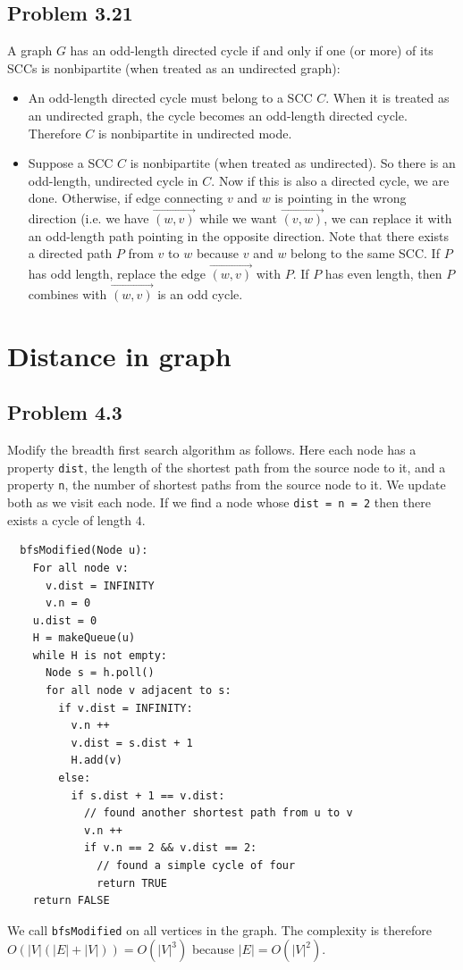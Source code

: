 \documentclass[12pt]{report}
\newcommand{\co}{\texttt}
\begin{document}
\section{Problem 3.21}
A graph $G$ has an odd-length directed cycle if and only if one (or more) of its SCCs is nonbipartite (when treated as an undirected graph):
\begin{itemize}
	\item An odd-length directed cycle must belong to a SCC $C$. When it is treated as an undirected graph, the cycle becomes an odd-length directed cycle. Therefore $C$ is nonbipartite in undirected mode.
	\item Suppose a SCC $C$ is nonbipartite (when treated as undirected). So there is an odd-length, undirected cycle in $C$. Now if this is also a directed cycle, we are done. Otherwise, if edge connecting $v$ and $w$ is pointing in the wrong direction (i.e. we have $\overrightarrow{(w,v)}$ while we want $\overrightarrow{(v,w)}$, we can replace it with an odd-length path pointing in the opposite direction. Note that there exists a directed path $P$ from $v$ to $w$ because $v$ and $w$ belong to the same SCC. If $P$ has odd length, replace the edge $\overrightarrow{(w,v)}$ with $P$. If $P$ has even length, then $P$ combines with $\overrightarrow{(w,v)}$ is an odd cycle.
\end{itemize}

\chapter[Chapter 4 Solution]{Distance in graph}
\section{Problem 4.3}
Modify the breadth first search algorithm as follows. Here each node has a property \co{dist}, the length of the shortest path from the source node to it, and a property \co{n}, the number of shortest paths from the source node to it. We update both as we visit each node. If we find a node whose \co{dist = n = 2} then there exists a cycle of length $4$.
\begin{lstlisting}
  bfsModified(Node u):
    For all node v:
      v.dist = INFINITY
      v.n = 0
    u.dist = 0
    H = makeQueue(u)
    while H is not empty:
      Node s = h.poll()
      for all node v adjacent to s:
        if v.dist = INFINITY:
          v.n ++
          v.dist = s.dist + 1
          H.add(v)
        else:
          if s.dist + 1 == v.dist:
            // found another shortest path from u to v
            v.n ++
            if v.n == 2 && v.dist == 2:
              // found a simple cycle of four
              return TRUE
    return FALSE
\end{lstlisting}
We call \co{bfsModified} on all vertices in the graph. The complexity is therefore $O(|V| ( |E| + |V|)) = O(|V|^3)$ because $|E| = O(|V|^2)$.
\end{document}
